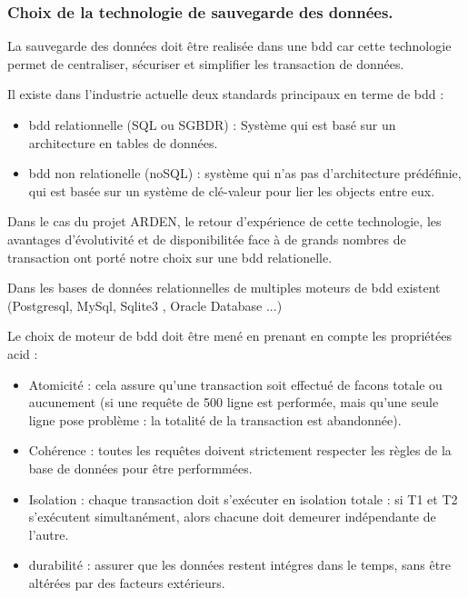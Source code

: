 
\justify
\subsubsection{Choix de la technologie de sauvegarde des données.}

La sauvegarde des données doit être realisée dans une \gls{bdd} car cette technologie permet de centraliser, sécuriser et simplifier les transaction de données.

Il existe dans l'industrie actuelle deux standards principaux en terme de \gls{bdd} :
\begin{itemize}
 \item \gls{bdd} relationnelle (SQL ou SGBDR) : Système qui est basé sur un  architecture en tables de données.
 \item \gls{bdd} non relationelle (noSQL) : système qui n'as pas d'architecture prédéfinie, qui est basée sur un système de clé-valeur pour lier les objects entre eux. \cite{BDD_theses}
\end{itemize}

Dans le cas du projet ARDEN, le retour d'expérience de cette technologie, les avantages d'évolutivité et de disponibilitée face à de grands nombres de transaction ont porté notre choix sur une \gls{bdd} relationelle.

Dans les bases de données relationnelles de multiples moteurs de \gls{bdd} existent (Postgresql, MySql, Sqlite3 , Oracle Database ...)

Le choix de moteur de \gls{bdd} doit être mené en prenant en compte les propriétées \gls{acid} :
\begin{itemize}
 \item Atomicité : cela assure qu'une transaction soit effectué de facons totale ou aucunement (si une requête de 500 ligne est performée, mais qu'une seule ligne pose problème : la totalité de la transaction est abandonnée). 
 \item Cohérence : toutes les requêtes doivent strictement respecter les règles de la base de données pour être performmées.
 \item Isolation : chaque transaction doit s'exécuter en isolation totale : si T1 et T2 s'exécutent simultanément, alors chacune doit demeurer indépendante de l'autre. 
 \item durabilité : assurer que les données restent intégres dans le temps, sans être altérées par des facteurs extérieurs.
 \cite{wikipedia_acid}
\end{itemize}

